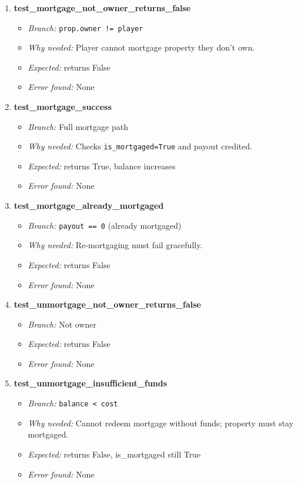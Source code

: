 \documentclass{article}
\begin{document}
\begin{enumerate}[resume, label=\textbf{TC\arabic*.}]

  \item \textbf{test\_mortgage\_not\_owner\_returns\_false}
  \begin{itemize}[noitemsep]
    \item \textit{Branch:} \texttt{prop.owner != player}
    \item \textit{Why needed:} Player cannot mortgage property they don't own.
    \item \textit{Expected:} returns False
    \item \textit{Error found:} None
  \end{itemize}

  \item \textbf{test\_mortgage\_success}
  \begin{itemize}[noitemsep]
    \item \textit{Branch:} Full mortgage path
    \item \textit{Why needed:} Checks \texttt{is\_mortgaged=True} and payout credited.
    \item \textit{Expected:} returns True, balance increases
    \item \textit{Error found:} None
  \end{itemize}

  \item \textbf{test\_mortgage\_already\_mortgaged}
  \begin{itemize}[noitemsep]
    \item \textit{Branch:} \texttt{payout == 0} (already mortgaged)
    \item \textit{Why needed:} Re-mortgaging must fail gracefully.
    \item \textit{Expected:} returns False
    \item \textit{Error found:} None
  \end{itemize}

  \item \textbf{test\_unmortgage\_not\_owner\_returns\_false}
  \begin{itemize}[noitemsep]
    \item \textit{Branch:} Not owner
    \item \textit{Expected:} returns False
    \item \textit{Error found:} None
  \end{itemize}

  \item \textbf{test\_unmortgage\_insufficient\_funds}
  \begin{itemize}[noitemsep]
    \item \textit{Branch:} \texttt{balance < cost}
    \item \textit{Why needed:} Cannot redeem mortgage without funds; property must stay mortgaged.
    \item \textit{Expected:} returns False, is\_mortgaged still True
    \item \textit{Error found:} None
  \end{itemize}


\end{enumerate}
\end{document}
